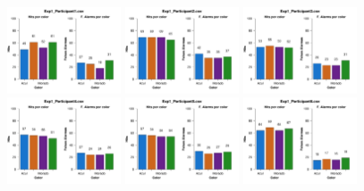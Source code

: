 \begin{figure}[th]
\centering
\includegraphics[width=0.30\textwidth]{Figures/Color_Exp1_P1} \includegraphics[width=0.30\textwidth]{Figures/Color_Exp1_P2} \includegraphics[width=0.30\textwidth]{Figures/Color_Exp1_P3}
\includegraphics[width=0.30\textwidth]{Figures/Color_Exp1_P4} \includegraphics[width=0.30\textwidth]{Figures/Color_Exp1_P5} \includegraphics[width=0.30\textwidth]{Figures/Color_Exp1_P6}

\end{figure}
